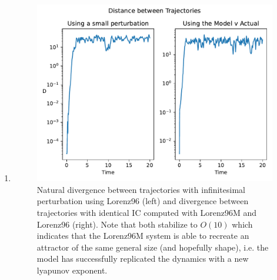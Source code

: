 \documentclass{article}
\begin{document}
\begin{enumerate}[label = \alph*).]
    \item 

    \begin{figure}[ht]
        \centering
        \includegraphics[width=\textwidth]{traj_div.pdf}
        \caption{Natural divergence between trajectories with infinitesimal
        perturbation using Lorenz96 (left) and divergence between trajectories
        with identical IC computed with
        Lorenz96M and Lorenz96 (right). Note that both stabilize to $O(10)$
        which indicates that the Lorenz96M system is able to recreate an attractor of the
        same general size (and hopefully shape), i.e. the model has successfully
        replicated the dynamics with a new lyapunov exponent.}
        \label{fig:attractor_size}
    \end{figure}


\end{enumerate}
\end{document}
